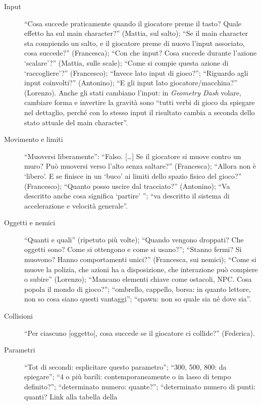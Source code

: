 \begin{description}
  \item[Input] ``Cosa succede praticamente quando il giocatore preme il
        tasto? Quale effetto ha sul main character?'' (Mattia, sul salto);
        ``Se il main character sta compiendo un salto, e il giocatore preme
        di nuovo l'input associato, cosa succede?'' (Francesca); ``Con che
        input? Cosa succede durante l'azione `scalare'?'' (Mattia, sulle
        scale); ``Come si compie questa azione di `raccogliere'?''
        (Francesco); ``Invece lato input di gioco?''; ``Riguardo agli input
        coinvolti?'' (Antonino); ``E gli input lato giocatore/macchina?''
        (Lorenzo). Anche gli stati cambiano l'input: in \emph{Geometry
        Dash} volare, cambiare forma e invertire la gravità sono ``tutti
        verbi di gioco da spiegare nel dettaglio, perché con lo stesso input
        il risultato cambia a seconda dello stato attuale del main
        character''.
  \item[Movimento e limiti] ``Muoversi liberamente'': ``Falso. [\dots] Se il
        giocatore si muove contro un muro? Può muoversi verso l'alto senza
        saltare?'' (Francesca); ``Allora non è `libero'. E se finisce in un
        `buco' ai limiti dello spazio fisico del gioco?'' (Francesco);
        ``Quanto posso uscire dal tracciato?'' (Antonino); ``Va descritto
        anche cosa significa `partire' ''; ``va descritto il sistema di
        accelerazione e velocità generale''.
  \item[Oggetti e nemici] ``Quanti e quali'' (ripetuto più volte);
        ``Quando vengono droppati? Che oggetti sono? Come si ottengono e come
        si usano?''; ``Stanno fermi? Si muovono? Hanno comportamenti unici?''
        (Francesca, sui nemici); ``Come si muove la polizia, che azioni ha a
        disposizione, che interazione può compiere o subire'' (Lorenzo);
        ``Mancano elementi chiave come ostacoli, NPC. Cosa popola il mondo di
        gioco?''; ``ombrello, cappello, borsa: in quanto lettore, non so cosa
        siano questi vantaggi''; ``spawn: non so quale sia né dove sia''.
  \item[Collisioni] ``Per ciascuno [oggetto], cosa succede se il giocatore
        ci collide?'' (Federica).
  \item[Parametri] ``Tot di secondi: esplicitare questo parametro''; ``300,
        500, 800: da spiegare''; ``4 o più barili: contemporaneamente o in
        lasso di tempo definito?''; ``determinato numero: quante?'';
        ``determinato numero di punti: quanti? Link alla tabella della

\end{description}
